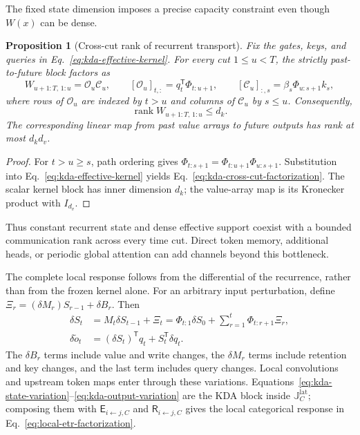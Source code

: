 \documentclass[10pt]{article}
\newtheorem{proposition}[theorem]{Proposition}
\theoremstyle{definition}
\theoremstyle{remark}
\begin{document}
The fixed state dimension imposes a precise capacity constraint even though $W(x)$ can be dense.

\begin{proposition}[Cross-cut rank of recurrent transport]
\label{prop:kda-cross-cut-rank}
Fix the gates, keys, and queries in Eq.~\ref{eq:kda-effective-kernel}.  For every cut
$1\leq u<T$, the strictly past-to-future block factors as
\begin{equation}
W_{u+1:T,\,1:u}=\mathcal O_u\mathcal C_u,
\qquad
[\mathcal O_u]_{t,:}=q_t^{\mathsf T}\Phi_{t:u+1},
\qquad
[\mathcal C_u]_{:,s}=\beta_s\Phi_{u:s+1}k_s,
\label{eq:kda-cross-cut-factorization}
\end{equation}
where rows of $\mathcal O_u$ are indexed by $t>u$ and columns of $\mathcal C_u$ by $s\leq u$.
Consequently,
\begin{equation}
\operatorname{rank}W_{u+1:T,\,1:u}\leq d_k.
\label{eq:kda-cross-cut-rank}
\end{equation}
The corresponding linear map from past value arrays to future outputs has rank at most $d_kd_v$.
\end{proposition}

\begin{proof}
For $t>u\geq s$, path ordering gives
$\Phi_{t:s+1}=\Phi_{t:u+1}\Phi_{u:s+1}$.  Substitution into
Eq.~\ref{eq:kda-effective-kernel} yields Eq.~\ref{eq:kda-cross-cut-factorization}.  The scalar
kernel block has inner dimension $d_k$; the value-array map is its Kronecker product with
$I_{d_v}$.
\end{proof}

Thus constant recurrent state and dense effective support coexist with a bounded communication
rank across every time cut.  Direct token memory, additional heads, or periodic global attention
can add channels beyond this bottleneck.

The complete local response follows from the differential of the recurrence, rather than from the
frozen kernel alone.  For an arbitrary input perturbation, define
$\Xi_r=(\delta M_r)S_{r-1}+\delta B_r$.  Then
\begin{align}
\delta S_t
&=M_t\delta S_{t-1}+\Xi_t
=\Phi_{t:1}\delta S_0+
\sum_{r=1}^{t}\Phi_{t:r+1}\Xi_r,
\label{eq:kda-state-variation}\\
\delta\widetilde o_t
&=(\delta S_t)^{\mathsf T}q_t+S_t^{\mathsf T}\delta q_t.
\label{eq:kda-output-variation}
\end{align}
The $\delta B_r$ terms include value and write changes, the $\delta M_r$ terms include retention and
key changes, and the last term includes query changes.  Local convolutions and upstream token maps
enter through these variations.  Equations~\ref{eq:kda-state-variation}--\ref{eq:kda-output-variation}
are the KDA block inside $\mathbb J_C^{\mathrm{lat}}$; composing them with
$\mathsf E_{i\leftarrow j,C}$ and $\mathsf R_{i\leftarrow j,C}$ gives the local categorical response
in Eq.~\ref{eq:local-etr-factorization}.
\end{document}
